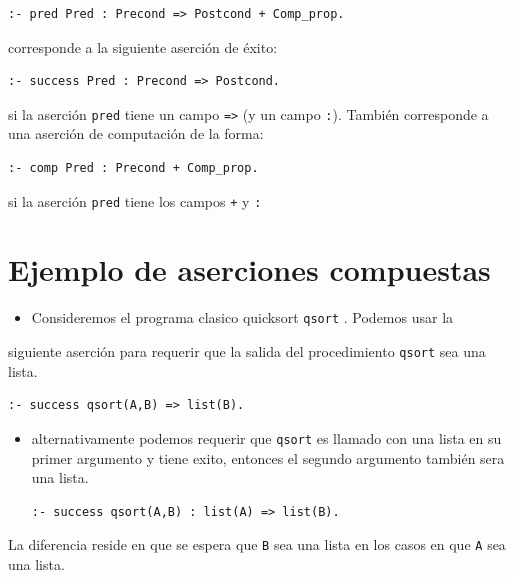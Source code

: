 \documentclass[11pt]{article}
\begin{document}
\begin{verbatim}
:- pred Pred : Precond => Postcond + Comp_prop.
\end{verbatim}
corresponde a la siguiente aserción de éxito:

\begin{verbatim}
:- success Pred : Precond => Postcond.
\end{verbatim}
si la aserción \texttt{pred} tiene un campo \texttt{=>} (y un campo
\texttt{:}). También corresponde a una aserción de computación de la forma:

\begin{verbatim}
:- comp Pred : Precond + Comp_prop.
\end{verbatim}
si la aserción \texttt{pred} tiene los campos \texttt{+} y \texttt{:} 

\section*{Ejemplo de aserciones compuestas}
\label{sec:org1e41ad1}
\begin{itemize}
\item Consideremos el programa clasico quicksort \texttt{qsort} . Podemos usar la
\end{itemize}
siguiente aserción para requerir que la salida del procedimiento
\texttt{qsort} sea una lista.

\begin{verbatim}
:- success qsort(A,B) => list(B).
\end{verbatim}
\begin{itemize}
\item alternativamente podemos requerir que \texttt{qsort} es llamado con una
lista en su primer argumento y tiene exito, entonces el segundo
argumento también sera una lista.

\begin{verbatim}
:- success qsort(A,B) : list(A) => list(B).
\end{verbatim}
\end{itemize}

La diferencia reside en que se espera que \texttt{B} sea una lista en los casos en que \texttt{A} sea una lista. 
\end{document}
